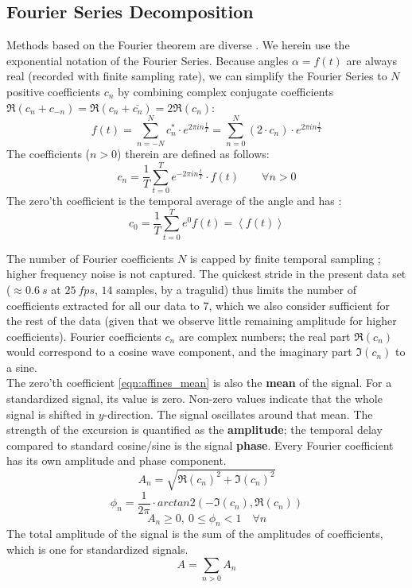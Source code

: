 \subsection{Fourier Series Decomposition}\label{apdx:fourier}
Methods based on the Fourier theorem are diverse \citep{Fourier1822,Gray1995,Bracewell2000}.
We herein use the exponential notation of the Fourier Series.
Because  angles $\alpha =f(t)$ are always real (recorded with finite sampling rate), we can simplify the Fourier Series to $N$ positive coefficients $c_{n}$ by combining complex conjugate coefficients $\Re(c_n + c_{-n}) = \Re(c_n + \overline{c_n}) = 2\Re(c_{n})$:
	\begin{equation}\label{eqn:fourier_series}
	f(t) = \sum\limits_{n=-N}^{N} c^{*}_{n}\cdot e^{2\pi i n \frac{t}{T}} = \sum\limits_{n=0}^{N} (2\cdot c_{n})\cdot e^{2\pi i n \frac{t}{T}}
	\end{equation}
The coefficients ($n>0$) therein are defined as follows:
	\begin{equation}\label{eqn:fourier_coefficients2}
	c_{n} = \frac{1}{T}\sum\limits_{t=0}^{T} e^{-2\pi i n \frac{t}{T}} \cdot f(t)  \quad\quad \forall n>0
	\end{equation}
The zero'th coefficient is the temporal average of the  angle and has :
	\begin{equation}\label{eqn:affines_mean}
	c_{0} = \frac{1}{T}\sum\limits_{t=0}^{T} e^{0} f(t) = \left\langle f(t)  \right\rangle
	\end{equation}

The number of Fourier coefficients $N$ is capped by finite temporal sampling \citep[Nyquist–Shannon sampling theorem,][]{Nyquist1928,Shannon1949}; higher frequency noise is not captured.
The quickest stride in the present data set ($\approx 0.6\ s$ at $25\ fps$, $14$ samples, by a tragulid) thus limits the number of coefficients extracted for all our data to $7$, which we also consider sufficient for the rest of the data (given that we observe little remaining amplitude for higher coefficients).
Fourier coefficients $c_{n}$ are complex numbers; the real part $\Re(c_{n})$ would correspond to a cosine wave component, and the imaginary part $\Im(c_{n})$ to a sine.
\bigskip\\The zero'th coefficient \eqref{eqn:affines_mean} is also the \textbf{mean} of the signal.
For a standardized signal, its value is zero.
Non-zero values indicate that the whole signal is shifted in $y$-direction.
The signal oscillates around that mean.
The strength of the excursion is quantified as the \textbf{amplitude}; the temporal delay compared to standard cosine/sine is the signal \textbf{phase}.
Every Fourier coefficient has its own amplitude and phase component.
$$A_{n} = \sqrt{\Re(c_{n})^{2}+\Im(c_{n})^{2}}$$
$$\phi_{n} = \frac{1}{2\pi}\cdot arctan2\left( -\Im(c_{n}),\Re(c_{n})\right)$$
$$A_{n} \ge 0,\ 0 \le \phi_{n} < 1 \quad \forall n$$
The total amplitude of the signal is the sum of the amplitudes of coefficients, which is one for standardized signals.
	\begin{equation}\label{eqn:affines_amplitude}
	A = \sum\limits_{n > 0} A_{n}
	\end{equation}


